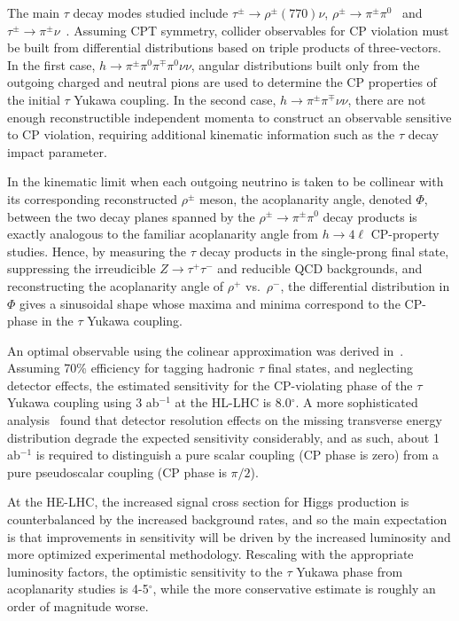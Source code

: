The main $\tau$ decay modes studied include $\tau^\pm \to
\rho^\pm (770) \nu$, $\rho^\pm \to \pi^\pm \pi^0$~\cite{Bower:2002zx,
  Desch:2003mw, Desch:2003rw, Harnik:2013aja, Askew:2015mda,
  Jozefowicz:2016kvz} and $\tau^\pm \to \pi^\pm
\nu$~\cite{Berge:2008wi, Berge:2008dr, Berge:2011ij}.  Assuming CPT
symmetry, collider observables for CP violation must be built from
differential distributions based on triple products of three-vectors.
In the first case, $h \to \pi^\pm \pi^0 \pi^\mp \pi^0 \nu \nu$,
angular distributions built only from the outgoing charged and neutral
pions are used to determine the CP properties of the initial $\tau$
Yukawa coupling.  In the second case, $h \to \pi^\pm \pi^\mp \nu \nu$,
there are not enough reconstructible independent momenta to construct an observable sensitive to CP violation, requiring additional kinematic information such as the $\tau$ decay impact parameter.

In the kinematic limit when each outgoing neutrino is taken to be
collinear with its corresponding reconstructed $\rho^\pm$ meson, the
acoplanarity angle, denoted $\Phi$, between the two decay planes
spanned by the $\rho^\pm \to \pi^\pm \pi^0$ decay products is exactly
analogous to the familiar acoplanarity angle from $h \to 4 \ell$
CP-property studies.  Hence, by measuring the $\tau$ decay products in
the single-prong final state, suppressing the irreudicible $Z \to
\tau^+ \tau^-$ and reducible QCD backgrounds, and reconstructing the
acoplanarity angle of $\rho^+$ vs.~$\rho^-$, the differential
distribution in $\Phi$ gives a sinusoidal shape whose maxima and
minima correspond to the CP-phase in the $\tau$ Yukawa coupling.  

An optimal observable using the colinear approximation was derived in~\cite{Harnik:2013aja}. Assuming 70\% efficiency for tagging hadronic $\tau$ final states, and
neglecting detector effects, the estimated sensitivity for the
CP-violating phase of the $\tau$ Yukawa coupling using 3 ab$^{-1}$ at
the HL-LHC is 8.0$^\circ$.  A more sophisticated
analysis~\cite{Askew:2015mda} found that detector resolution effects
on the missing transverse energy distribution degrade the expected
sensitivity considerably, and as such, about 1 ab$^{-1}$ is required
to distinguish a pure scalar coupling (CP phase is zero) from a pure
pseudoscalar coupling (CP phase is $\pi/2$).

At the HE-LHC, the increased signal cross section for Higgs production
is counterbalanced by the increased background rates, and so the main
expectation is that improvements in sensitivity will be driven by the
increased luminosity and more optimized experimental methodology.
Rescaling with the appropriate luminosity factors, the optimistic
sensitivity to the $\tau$ Yukawa phase from acoplanarity studies is
4-5$^\circ$, while the more conservative estimate is roughly an order
of magnitude worse.

